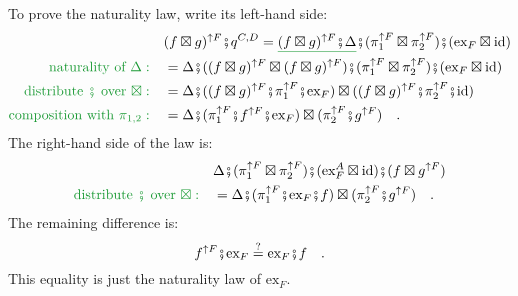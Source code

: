 To prove the naturality law, write its left-hand side:
\begin{align*}
 & (f\boxtimes g)^{\uparrow F}\bef q^{C,D}=\gunderline{(f\boxtimes g)^{\uparrow F}\bef\Delta}\bef(\pi_{1}^{\uparrow F}\boxtimes\pi_{2}^{\uparrow F})\bef(\text{ex}_{F}\boxtimes\text{id})\\
{\color{greenunder}\text{naturality of }\Delta:}\quad & =\Delta\bef((f\boxtimes g)^{\uparrow F}\boxtimes(f\boxtimes g)^{\uparrow F})\bef(\pi_{1}^{\uparrow F}\boxtimes\pi_{2}^{\uparrow F})\bef(\text{ex}_{F}\boxtimes\text{id})\\
{\color{greenunder}\text{distribute }\bef\text{ over }\text{\ensuremath{\boxtimes}}:}\quad & =\Delta\bef((f\boxtimes g)^{\uparrow F}\bef\pi_{1}^{\uparrow F}\bef\text{ex}_{F})\boxtimes((f\boxtimes g)^{\uparrow F}\bef\pi_{2}^{\uparrow F}\bef\text{id})\\
{\color{greenunder}\text{composition with }\pi_{1,2}:}\quad & =\Delta\bef(\pi_{1}^{\uparrow F}\bef f^{\uparrow F}\bef\text{ex}_{F})\boxtimes(\pi_{2}^{\uparrow F}\bef g^{\uparrow F})\quad.
\end{align*}
The right-hand side of the law is:
\begin{align*}
 & \Delta\bef(\pi_{1}^{\uparrow F}\boxtimes\pi_{2}^{\uparrow F})\bef(\text{ex}_{F}^{A}\boxtimes\text{id})\bef(f\boxtimes g^{\uparrow F})\\
{\color{greenunder}\text{distribute }\bef\text{ over }\text{\ensuremath{\boxtimes}}:}\quad & =\Delta\bef(\pi_{1}^{\uparrow F}\bef\text{ex}_{F}\bef f)\boxtimes(\pi_{2}^{\uparrow F}\bef g^{\uparrow F})\quad.
\end{align*}
The remaining difference is:
\[
f^{\uparrow F}\bef\text{ex}_{F}\overset{?}{=}\text{ex}_{F}\bef f\quad.
\]
This equality is just the naturality law of $\text{ex}_{F}$.

